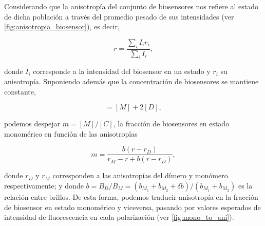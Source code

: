 Considerando que la anisotropía del conjunto de biosensores nos refiere al estado de dicha población a través del promedio pesado de sus intensidades (ver \cref{fig:anisotropia_biosensor}), es decir, 

\begin{equation}
r = \frac{\sum_i I_i r_i}{\sum_i I_i}, \label{eq:anisotropiaInt}
\end{equation}

\noindent donde $I_i$ corresponde a la intensidad del biosensor en un estado y $r_i$ su anisotropía. Suponiendo además que la concentración de biosensores se mantiene constante, 

\begin{equation}
    [C] = [M] + 2[D],
    \label{eq:C_cte}
\end{equation}

\noindent podemos despejar $m = [M]/[C]$, la fracción de biosensores en estado monomérico en función de las anisotropías

\begin{equation}
	m = \frac{b (r - r_D)}{r_M - r + b (r - r_D)},
	\label{eq:m_from_r}
\end{equation}

\noindent donde $r_D$ y $r_M$ corresponden a las anisotropías del dímero y monómero respectivamente; y donde $b=B_D/B_M = (b_{M_1} + b_{M_2} + \delta b) / (b_{M_1} + b_{M_2})$ es la relación entre brillos. De esta forma, podemos traducir anisotropía en la fracción de biosensor en estado monomérico y viceversa, pasando por valores esperados de intensidad de fluorescencia en cada polarización (ver \cref{fig:mono_to_ani}).

